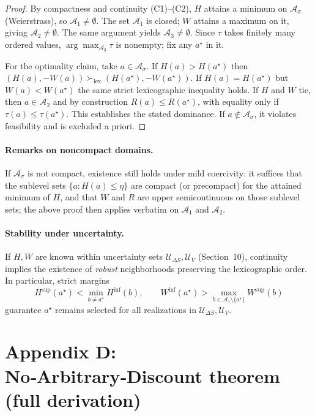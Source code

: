 \documentclass[11pt]{article}
\begin{document}
\begin{proof}
By compactness and continuity (C1)–(C2), $H$ attains a minimum on $\mathcal{A}_\sigma$ (Weierstrass), so $\mathcal{A}_1\neq\emptyset$. The set $\mathcal{A}_1$ is closed; $W$ attains a maximum on it, giving $\mathcal{A}_2\neq\emptyset$. The same argument yields $\mathcal{A}_3\neq\emptyset$. Since $\tau$ takes finitely many ordered values, $\arg\max_{\mathcal{A}_3}\tau$ is nonempty; fix any $a^\star$ in it.

For the optimality claim, take $a\in\mathcal{A}_\sigma$. If $H(a)>H(a^\star)$ then $(H(a),-W(a))\succ_{\mathrm{lex}}(H(a^\star),-W(a^\star))$. If $H(a)=H(a^\star)$ but $W(a)<W(a^\star)$ the same strict lexicographic inequality holds. If $H$ and $W$ tie, then $a\in\mathcal{A}_2$ and by construction $R(a)\le R(a^\star)$, with equality only if $\tau(a)\le \tau(a^\star)$. This establishes the stated dominance. If $a\notin\mathcal{A}_\sigma$, it violates feasibility and is excluded a priori.
\end{proof}

\paragraph{Remarks on noncompact domains.}
If $\mathcal{A}_\sigma$ is not compact, existence still holds under mild coercivity: it suffices that the sublevel sets $\{a: H(a)\le \eta\}$ are compact (or precompact) for the attained minimum of $H$, and that $W$ and $R$ are upper semicontinuous on those sublevel sets; the above proof then applies verbatim on $\mathcal{A}_1$ and $\mathcal{A}_2$.

\paragraph{Stability under uncertainty.}
If $H,W$ are known within uncertainty sets $\mathcal{U}_{\Delta S},\mathcal{U}_V$ (Section~10), continuity implies the existence of \emph{robust} neighborhoods preserving the lexicographic order. In particular, strict margins
\[
H^{\sup}(a^\star) < \min_{b\neq a^\star} H^{\inf}(b),\qquad
W^{\inf}(a^\star) > \max_{b\in \mathcal{A}_1\setminus\{a^\star\}} W^{\sup}(b)
\]
guarantee $a^\star$ remains selected for all realizations in $\mathcal{U}_{\Delta S},\mathcal{U}_V$.


\section{Appendix D: No‑Arbitrary‑Discount theorem (full derivation)}
\end{document}
